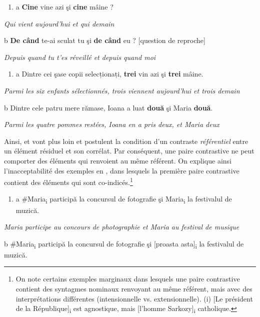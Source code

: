 \begin{enumerate}
\item \label{bkm:Ref289452061}a  \textbf{Cine} vine azi şi \textbf{cine} mâine ?


\end{enumerate}
{\itshape
Qui vient aujourd'hui et qui demain } 

  b  \textbf{De când} te-ai sculat tu şi \textbf{de când} eu ?  [question de reproche]

    \textit{Depuis quand tu t'es réveillé et depuis quand moi}


\begin{enumerate}
\item \label{bkm:Ref289452076}a  Dintre cei şase copii selecționați, \textbf{trei} vin azi şi \textbf{trei} mâine.


\end{enumerate}
{\itshape
Parmi les six enfants sélectionnés, trois viennent aujourd'hui et trois demain} 

  b  Dintre cele patru mere rămase, Ioana a luat \textbf{două} şi Maria \textbf{două}.

    \textit{Parmi les quatre pommes restées, Ioana en a pris deux, et Maria deux}

Ainsi, \citet{Hartmann2000} et \citet{Repp2009} vont plus loin et postulent la condition d'un contraste \textit{référentiel} entre un élément résiduel et son corrélat. Par conséquent, une paire contrastive ne peut comporter des éléments qui renvoient au même référent. On explique ainsi l'inacceptabilité des exemples en , dans lesquels la première paire contrastive contient des éléments qui sont co-indicés.\footnote{On note certains exemples marginaux dans lesquels une paire contrastive contient des syntagmes nominaux renvoyant au même référent, mais avec des interprétations différentes (intensionnelle vs. extensionnelle). 
(i)  [Le président de la République]\textsubscript{i} est agnostique, mais [l'homme Sarkozy]\textsubscript{i} catholique.}


\begin{enumerate}
\item \label{bkm:Ref299633369}a  \#Maria\textsubscript{i} participă la concursul de fotografie şi Maria\textsubscript{i} la festivalul de muzică.


\end{enumerate}
{\itshape
Maria participe au concours de photographie et Maria au festival de musique } 

  b  \#Maria\textsubscript{i} participă la concursul de fotografie şi [proasta asta]\textsubscript{i} la festivalul de muzică. 

